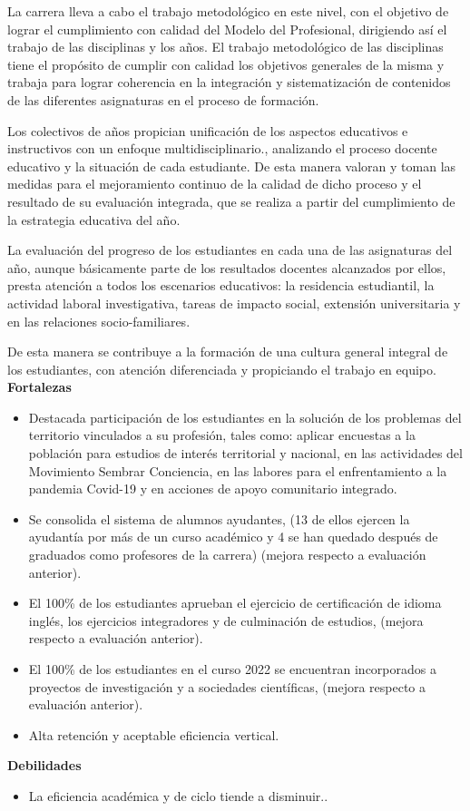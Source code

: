 La carrera lleva a cabo el trabajo metodológico en este nivel, con el objetivo de lograr el cumplimiento con calidad del Modelo del Profesional, dirigiendo así el trabajo de las disciplinas y los años.
El trabajo metodológico de las disciplinas tiene el propósito de cumplir con calidad los objetivos generales de la misma y trabaja para lograr coherencia en la integración y sistematización de contenidos de las diferentes asignaturas en el proceso de formación.

Los colectivos de años propician unificación de los aspectos educativos e instructivos con un enfoque multidisciplinario., analizando el proceso docente educativo y la situación de cada estudiante. De esta manera valoran y toman las medidas para el mejoramiento continuo de la calidad de dicho proceso y el resultado de su evaluación integrada, que se realiza a partir del cumplimiento de la estrategia educativa del año.

La evaluación del progreso de los estudiantes en cada una de las asignaturas del año, aunque básicamente parte de los resultados docentes alcanzados por ellos, presta atención a todos los escenarios educativos: la residencia estudiantil, la actividad laboral investigativa, tareas de impacto social, extensión universitaria y en las relaciones socio-familiares.

De esta manera se contribuye a la formación de una cultura general integral de los estudiantes, con atención diferenciada y propiciando el trabajo en equipo.\\

\textbf{Fortalezas}

\begin{itemize}
	\setlength\itemsep{-0.5em}
	\item Destacada participación de los estudiantes en la solución de los problemas del territorio vinculados a su profesión, tales como: aplicar encuestas a la población para estudios de interés territorial y nacional, en las actividades del Movimiento Sembrar Conciencia, en las labores para el enfrentamiento a la pandemia Covid-19 y en acciones de apoyo comunitario integrado.
	\item Se consolida el sistema de alumnos ayudantes, (13 de ellos ejercen la ayudantía por más de un curso académico y 4 se han quedado después de graduados como profesores de la carrera) (mejora respecto a evaluación anterior). 
	\item El 100\% de los estudiantes aprueban el ejercicio de certificación de idioma inglés, los ejercicios integradores y de culminación de estudios, (mejora respecto a evaluación anterior).  
	\item  El 100\% de los estudiantes en el curso 2022 se encuentran incorporados a proyectos de investigación y a sociedades científicas, (mejora respecto a evaluación anterior).
	\item Alta retención y aceptable eficiencia vertical.
\end{itemize}

\textbf{Debilidades}

\begin{itemize}
	\setlength\itemsep{-0.5em}
	\item La eficiencia académica y de ciclo tiende a disminuir..
\end{itemize}
